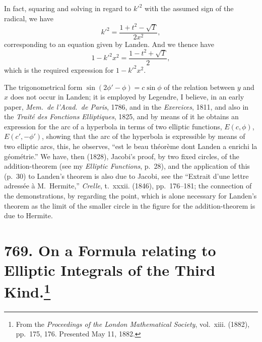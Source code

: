 \documentclass[11pt,a4paper]{article}
\theoremstyle{definition}
\begin{document}
In fact, squaring and solving in regard to $k'^2$ with the assumed sign of the radical, we have
\[
k'^2 = \frac{1 + t^2 - \sqrt{T}}{2x^2},
\]
corresponding to an equation given by Landen. And we thence have
\[
1 - k'^2x^2 = \frac{1 - t^2 + \sqrt{T}}{2},
\]
which is the required expression for $1 - k'^2x^2$.

The trigonometrical form $\sin(2\phi' - \phi) = c\sin\phi$ of the relation between $y$ and $x$ does not occur in Landen; it is employed by Legendre, I believe, in an early paper, \textit{Mem.~de l'Acad.~de Paris}, 1786, and in the \textit{Exercices}, 1811, and also in the \textit{Trait\'e des Fonctions Elliptiques}, 1825, and by means of it he obtains an expression for the arc of a hyperbola in terms of two elliptic functions, $E(c, \phi)$, $E(c', -\phi')$, showing that the arc of the hyperbola is expressible by means of two elliptic arcs, this, he observes, ``est le beau th\'eor\`eme dont Landen a enrichi la g\'eom\'etrie.'' We have, then (1828), Jacobi's proof, by two fixed circles, of the addition-theorem (see my \textit{Elliptic Functions}, p.~28), and the application of this (p.~30) to Landen's theorem is also due to Jacobi, see the ``Extrait d'une lettre adress\'ee \`a M.~Hermite,'' \textit{Crelle}, t.~xxxii. (1846), pp.~176--181; the connection of the demonstrations, by regarding the point, which is alone necessary for Landen's theorem as the limit of the smaller circle in the figure for the addition-theorem is due to Hermite.

\newpage
\section[On a Formula relating to Elliptic Integrals of the Third Kind]{769. On a Formula relating to Elliptic Integrals of the Third Kind.\footnote{From the \textit{Proceedings of the London Mathematical Society}, vol.~xiii. (1882), pp.~175, 176. Presented May 11, 1882.}}
\end{document}
